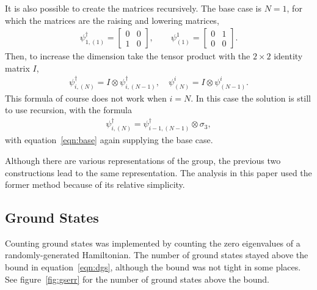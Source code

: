 \documentclass[12pt]{article} %
\begin{document}
It is also possible to create the matrices recursively. The base case is $N=1$, for which the matrices are the raising and lowering matrices,
\begin{align}
\psi^\dag_{1,(1)} = \begin{bmatrix} 0&0\\1&0 \end{bmatrix}, \qquad
    \psi^1_{(1)} = \begin{bmatrix} 0&1\\0&0 \end{bmatrix}. \label{eqn:base}
\end{align}
Then, to increase the dimension take the tensor product with the $2\times 2$ identity matrix $I$,
\begin{align}
\psi^\dag_{i,(N)} = I\otimes\psi^\dag_{i,(N-1)},\quad \psi^i_{(N)} = I\otimes 
	\psi^i_{(N-1)}.
\end{align}
This formula of course does not work when $i=N$. In this case the solution is still to use recursion, with the formula
\begin{align}
\psi^\dag_{i,(N)} = \psi^\dag_{i-1,(N-1)}\otimes\sigma_3,
\end{align}
with equation~\ref{eqn:base} again supplying the base case.

Although there are various representations of the group, the previous two constructions lead to the same representation. The analysis in this paper used the former method because of its relative simplicity.

\subsection{Ground States} \emph{} \label{sub:num_gs}

Counting ground states was implemented by counting the zero eigenvalues of a randomly-generated Hamiltonian. The number of ground states stayed above the bound in equation~\ref{eqn:dgs}, although the bound was not tight in some places. See figure~\ref{fig:gserr} for the number of ground states above the bound.
\end{document}
